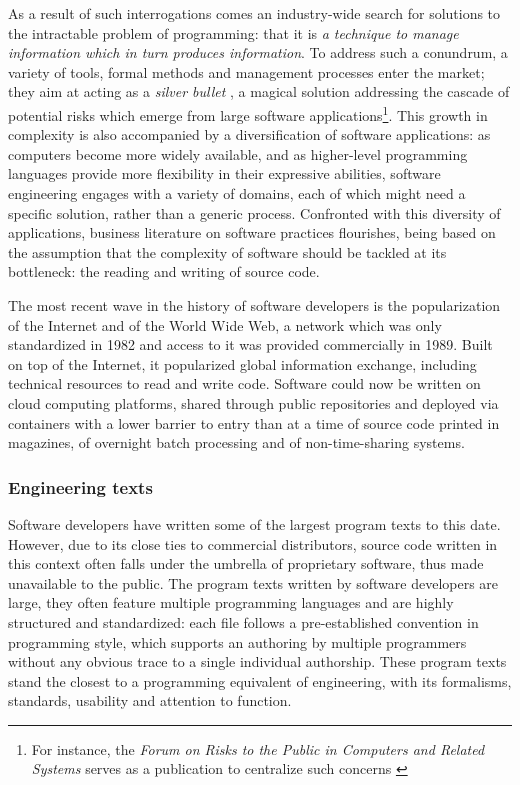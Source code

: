 As a result of such interrogations comes an industry-wide search for solutions to the intractable problem of programming: that it is \emph{a technique to manage information which in turn produces information}. To address such a conundrum, a variety of tools, formal methods and management processes enter the market; they aim at acting as a \emph{silver bullet} \citep{brooksjr_mythical_1975}, a magical solution addressing the cascade of potential risks which emerge from large software applications\footnote{For instance, the \emph{Forum on Risks to the Public in Computers and Related Systems} serves as a publication to centralize such concerns \citep{neumann_computerrelated_1985}}. This growth in complexity is also accompanied by a diversification of software applications: as computers become more widely available, and as higher-level programming languages provide more flexibility in their expressive abilities, software engineering engages with a variety of domains, each of which might need a specific solution, rather than a generic process. Confronted with this diversity of applications, business literature on software practices flourishes, being based on the assumption that the complexity of software should be tackled at its bottleneck: the reading and writing of source code.

The most recent wave in the history of software developers is the popularization of the Internet and of the World Wide Web, a network which was only standardized in 1982 and access to it was provided commercially in 1989. Built on top of the Internet, it popularized global information exchange, including technical resources to read and write code. Software could now be written on cloud computing platforms, shared through public repositories and deployed via containers with a lower barrier to entry than at a time of source code printed in magazines, of overnight batch processing and of non-time-sharing systems.

\subsubsection{Engineering texts}
\label{subsubsec:engineering-texts}

Software developers have written some of the largest program texts to this date. However, due to its close ties to commercial distributors, source code written in this context often falls under the umbrella of proprietary software, thus made unavailable to the public. The program texts written by software developers are large, they often feature multiple programming languages and are highly structured and standardized: each file follows a pre-established convention in programming style, which supports an authoring by multiple programmers without any obvious trace to a single individual authorship. These program texts stand the closest to a programming equivalent of engineering, with its formalisms, standards, usability and attention to function.

